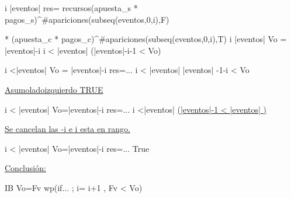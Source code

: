 \vspace{0.3cm}

\leq i \leq |eventos| \yLuego res= recursos(apuesta_s * pagos_s)^{\#apariciones(subseq(eventos,0,i),F)}

\vspace{0.2cm}
*\phantom{.} (apuesta_c * pagos_c)^{\#apariciones(subseq(eventos,0,i),T)} \wedge i \in |eventos| \wedge Vo = |eventos|-i \leq i < |eventos| \yLuego \phantom{...}\hspace{17}  
(|eventos|-i-1 < Vo)



\vspace{0.3cm}

\leq i <|eventos| \wedge Vo = |eventos|-i \wedge res=... \leq i < |eventos| \wedge |eventos| -1-i < Vo

\vspace{0.3cm}

\underline{Asumo\hspace{3}lado\hspace{3}izquierdo\hspace{3} TRUE}

\vspace{0.3cm}

\leq i < |eventos| \wedge Vo=|eventos|-i \wedge res=... \leq i <|eventos| \wedge \underline{(|eventos|-1  < |eventos| )} 

\vspace{0.3cm}

\underline{Se cancelan las -i e i esta en rango.}

\vspace{0.3cm}


\leq i < |eventos| \wedge Vo=|eventos|-i \wedge res=... \rightarrow True

\vspace{0.3cm}

\underline{Conclusi\'on:}
\vspace{0.2cm}

I\wedge B \wedge Vo=Fv \rightarrow wp(if... ; i= i+1 , Fv < Vo)


